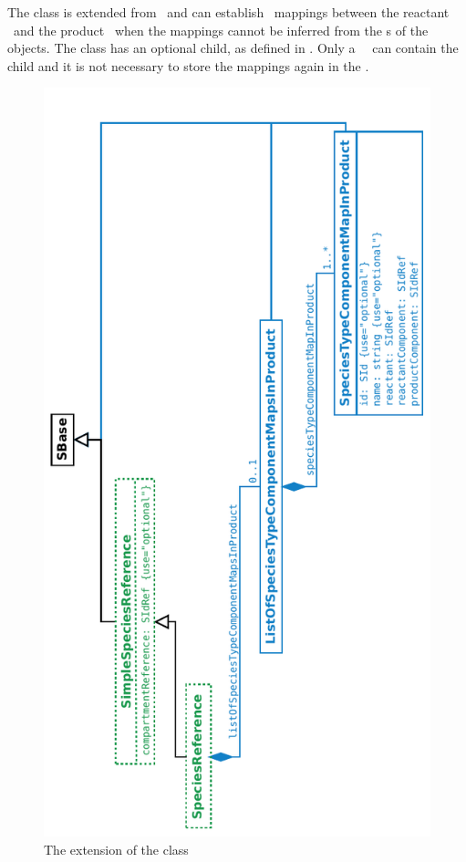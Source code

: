 The \SpeciesReference class is extended from \SbmlLevelThreeCore\ and can establish \component\ mappings between the reactant \species\ and the product \species\ when the mappings cannot be inferred from the \idAtt s of the \SpeciesTypeInstance objects. The \SpeciesReference class has an optional \ListOfSpeciesTypeComponentMapsInProduct child, as defined in . Only a \reaction\ \product\ can contain the \ListOfSpeciesTypeComponentMapsInProduct child and it is not necessary to store the mappings again in the \reactants.

\begin{figure}[htb]
  \begin{center}
    \includegraphics[angle=-90, scale=0.75]{./figs/multi_011_SpeciesReference.pdf}
    \caption{The extension of the \ExSpeciesReference class}
  \label{fig:ExSpeciesReference}
  \end{center}
\end{figure}

